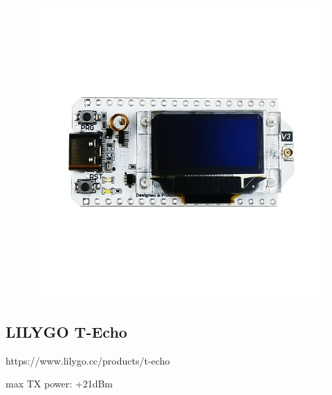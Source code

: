 \documentclass[12pt,a4paper]{article}
\begin{document}
\begin{figure}
	\includegraphics[scale=0.1]{heltec-lora32-v3.png}
\end{figure}

\subsection{LILYGO T-Echo}

https://www.lilygo.cc/products/t-echo


max TX power: +21dBm
\end{document}
